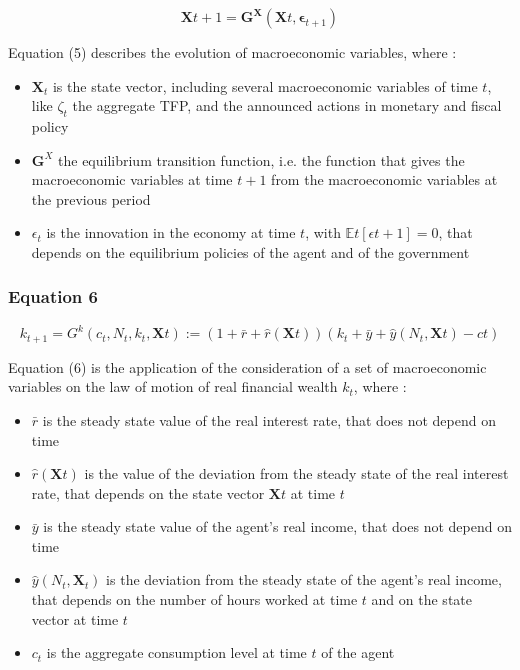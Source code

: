 \documentclass{article}
\begin{document}
\begin{equation}
    \bm{X}{t+1}=\bm{G}^{\bm{X}}\left(\bm{X}{t},\bm{\epsilon}_{t+1}\right)
\end{equation}

Equation (5) describes the evolution of macroeconomic variables, where : 
\begin{itemize}
    \item $\bm{X}_t$ is the state vector, including several macroeconomic variables of time $t$, like $\zeta_t$ the aggregate TFP, and the announced actions in monetary and fiscal policy
    \item $\bm{G}^X$ the equilibrium transition function, i.e. the function that gives the macroeconomic variables at time $t+1$ from the macroeconomic variables at the previous period
    \item $\epsilon_{t}$ is the innovation in the economy at time $t$, with $\mathbb{E}{t}\left[\epsilon{t+1}\right]=0$, that depends on the equilibrium policies of the agent and of the government
\end{itemize}

\subsubsection*{Equation 6}

\begin{equation}
    k_{t+1}=G^{k}(c_{t},N_{t}, k_{t}, \bm{X}t):= (1+\bar{r}+\hat{r}(\bm{X}{t}))(k_{t}+\bar{y}+\hat{y}(N_{t},\bm{X}t)-c{t})
\end{equation}

Equation (6) is the application of the consideration of a set of macroeconomic variables on the law of motion of real financial wealth $k_{t}$, where : 
\begin{itemize}
    \item $\bar{r}$ is the steady state value of the real interest rate, that does not depend on time
    \item $\hat{r}(\bm{X}t)$ is the value of the deviation from the steady state of the real interest rate, that depends on the state vector $\bm{X}{t}$ at time $t$
    \item $\bar{y}$ is the steady state value of the agent's real income, that does not depend on time
    \item $\hat{y}(N_{t},\bm{X}_{t})$ is the deviation from the steady state of the agent's real income, that depends on the number of hours worked at time $t$ and on the state vector at time $t$
    \item $c_{t}$ is the aggregate consumption level at time $t$ of the agent
\end{itemize}
\end{document}
